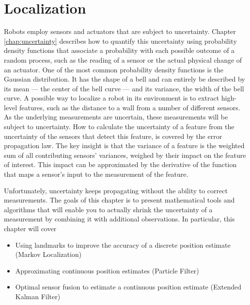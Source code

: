 \chapter{Localization}\label{chap:localization}
Robots employ sensors and actuators that are subject to uncertainty. Chapter \ref{chap:uncertainty} describes how to quantify this uncertainty using probability density functions that associate a probability with each possible outcome of a random process, such as the reading of a sensor or the actual physical change of an actuator. One of the most common probability density functions is the Gaussian distribution. It has the shape of a bell and can entirely be described by its mean --- the center of the bell curve --- and its variance, the width of the bell curve. A possible way to localize a robot in its environment is to extract high-level features, such as the distance to a wall from a number of different sensors. As the underlying measurements are uncertain, these measurements will be subject to uncertainty. How to calculate the uncertainty of a feature from the uncertainty of the sensors that detect this feature, is covered by the error propagation law. The key insight is that the variance of a feature is the weighted sum of all contributing sensors' variances, weighed by their impact on the feature of interest. This impact can be approximated by the derivative of the function that maps a sensor's input to the measurement of the feature. 

 Unfortunately, uncertainty keeps propagating without the ability to correct measurements. The goals of this chapter is to present mathematical tools and algorithms that will enable you to actually shrink the uncertainty of a measurement by combining it with additional observations.  In particular, this chapter will cover
\begin{itemize}
\item Using landmarks to improve the accuracy of a discrete position estimate (Markov Localization)
\item Approximating continuous position estimates (Particle Filter)
\item Optimal sensor fusion to estimate a continuous position estimate (Extended Kalman Filter)
\end{itemize}

